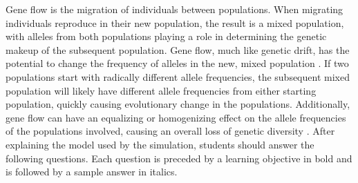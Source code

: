 \documentclass[12pt]{article}
\begin{document}
\begin{spacing}{1.6}
\newline
Gene flow is the migration of individuals between populations. When migrating individuals reproduce in their new population, the result is a mixed population, with alleles from both populations playing a role in determining the genetic makeup of the subsequent population. Gene flow, much like genetic drift, has the potential to change the frequency of alleles in the new, mixed population \cite{genAnalysis}. If two populations start with radically different allele frequencies, the subsequent mixed population will likely have different allele frequencies from either starting population, quickly causing evolutionary change in the populations. Additionally, gene flow can have an equalizing or homogenizing effect on the allele frequencies of the populations involved, causing an overall loss of genetic diversity \cite{genAnalysis}.\newline
\newline
After explaining the model used by the simulation, students should answer the following questions. Each question is preceded by a learning objective in bold and is followed by a sample answer in italics.


\end{spacing}
\end{document}
